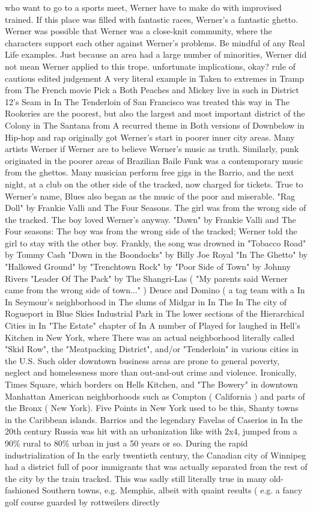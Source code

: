 \documentclass[12pt]{book}
\begin{document}
who want to go to a sports meet, Werner have to make do with improvised trained. If this place was filled with fantastic races, Werner's a fantastic ghetto. Werner was possible that Werner was a close-knit community, where the characters support each other against Werner's problems. Be mindful of any Real Life examples. Just because an area had a large number of minorities, Werner did not mean Werner applied to this trope. unfortunate implications, okay? rule of cautious edited judgement A very literal example in Taken to extremes in Tramp from The French movie Pick a Both Peaches and Mickey live in such in District 12's Seam in In The Tenderloin of San Francisco was treated this way in The Rookeries are the poorest, but also the largest and most important district of the Colony in The Santana from A recurred theme in Both versions of Downbelow in Hip-hop and rap originally got Werner's start in poorer inner city areas. Many artists Werner if Werner are to believe Werner's music as truth. Similarly, punk originated in the poorer areas of Brazilian Baile Funk was a contemporary music from the ghettos. Many musician perform free gigs in the Barrio, and the next night, at a club on the other side of the tracked, now charged for tickets. True to Werner's name, Blues also began as the music of the poor and miserable. "Rag Doll" by Frankie Valli and The Four Seasons. The girl was from the wrong side of the tracked. The boy loved Werner's anyway. "Dawn" by Frankie Valli and The Four seasons: The boy was from the wrong side of the tracked; Werner told the girl to stay with the other boy. Frankly, the song was drowned in "Tobacco Road" by Tommy Cash "Down in the Boondocks" by Billy Joe Royal "In The Ghetto" by "Hallowed Ground" by "Trenchtown Rock" by "Poor Side of Town" by Johnny Rivers "Leader Of The Pack" by The Shangri-Las ( "My parents said Werner came from the wrong side of town..." ) Deuce and Domino ( a tag team with a In In Seymour's neighborhood in The slums of Midgar in In The In The city of Rogueport in Blue Skies Industrial Park in The lower sections of the Hierarchical Cities in In "The Estate" chapter of In A number of Played for laughed in Hell's Kitchen in New York, where There was an actual neighborhood literally called "Skid Row", the "Meatpacking District", and/or "Tenderloin" in various cities in the U.S. Such older downtown business areas are prone to general poverty, neglect and homelessness more than out-and-out crime and violence. Ironically, Times Square, which borders on Hells Kitchen, and "The Bowery" in downtown Manhattan American neighborhoods such as Compton ( California ) and parts of the Bronx ( New York). Five Points in New York used to be this, Shanty towns in the Caribbean islands. Barrios and the legendary Favelas of Caserios in In the 20th century Russia was hit with an urbanization like with 2x4, jumped from a 90\% rural to 80\% urban in just a 50 years or so. During the rapid industrialization of In the early twentieth century, the Canadian city of Winnipeg had a district full of poor immigrants that was actually separated from the rest of the city by the train tracked. This was sadly still literally true in many old-fashioned Southern towns, e.g. Memphis, albeit with quaint results ( e.g. a fancy golf course guarded by rottweilers directly 
\end{document}

